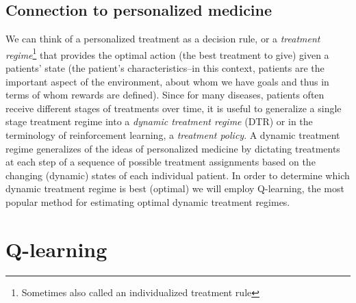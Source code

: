 \documentclass[12pt]{article}
\begin{document}

\subsection{Connection to personalized medicine} %
\label{sub:dynamic_treatment_regimes}

We can think of a personalized treatment as a decision rule, or a \emph{treatment regime}\footnote{Sometimes also called an individualized treatment rule} that provides the optimal action (the best treatment to give) given a patients' state (the patient's characteristics--in this context, patients are the important aspect of the environment, about whom we have goals and thus in terms of whom rewards are defined). Since for many diseases, patients often receive different stages of treatments over time, it is useful to generalize a single stage treatment regime into a \emph{dynamic treatment regime} (DTR) or in the terminology of reinforcement learning, a \emph{treatment policy}. A dynamic treatment regime generalizes of the ideas of personalized medicine by dictating treatments at each step of a sequence of possible treatment assignments based on the changing (dynamic) states of each individual patient. In order to determine which dynamic treatment regime is best (optimal) we will employ Q-learning, the most popular method for estimating optimal dynamic treatment regimes.



\section{Q-learning} %
\label{sec:q_learning}
\end{document}
